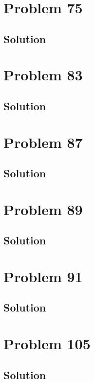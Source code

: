 \documentclass[12pt]{article}
\begin{document}
    \pagebreak
    \section{Problem 75}

        \subsection{Solution}

    \pagebreak
    \section{Problem 83}

        \subsection{Solution}

    \pagebreak
    \section{Problem 87}

        \subsection{Solution}

    \pagebreak
    \section{Problem 89}

        \subsection{Solution}

    \pagebreak
    \section{Problem 91}

        \subsection{Solution}

    \pagebreak
    \section{Problem 105}

        \subsection{Solution}

    \pagebreak
    \tableofcontents
\end{document}
